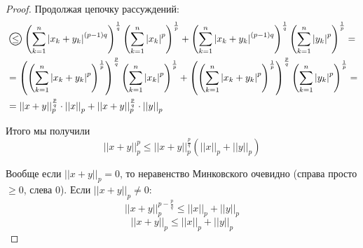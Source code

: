 \documentclass[../main.tex]{subfiles}
\begin{document}
\begin{proof}
    Продолжая цепочку рассуждений:
    \begin{equation*}
        \begin{aligned}
            &\oleq \left( \sum\limits_{ k=1}^{ n} \left| x_k+y_k\right|^{(p-1)q}\right)^ \frac{ 1}{ q} \left( \sum\limits_{ k=1}^{ n} \left| x_k\right|^p\right)^ \frac{ 1}{ p} + \left( \sum\limits_{ k=1}^{ n} \left| x_k+y_k\right|^{(p-1)q}\right)^ \frac{ 1}{ q} \left( \sum\limits_{ k=1}^{ n} \left| y_k\right|^p\right)^ \frac{ 1}{ p} = \\
            &=\left(\left( \sum\limits_{ k=1}^{ n} \left| x_k+y_k\right|^p\right)^ \frac{ 1}{ p}\right)^ \frac{ p}{ q} \left( \sum\limits_{ k=1}^{ n} \left| x_k\right|^p\right)^ \frac{ 1}{ p} + \left(\left( \sum\limits_{ k=1}^{ n} \left| x_k+y_k\right|^p\right)^ \frac{ 1}{ p}\right)^ \frac{ p}{ q} \left( \sum\limits_{ k=1}^{ n} \left| y_k\right|^p\right)^ \frac{ 1}{ p} =\\
            &=\left| \left| x+y\right|\right|_p^ \frac{ p}{ q} \cdot \left| \left| x\right|\right|_p+ \left| \left| x+y\right|\right|_p^ \frac{ p}{ q} \cdot \left| \left| y\right|\right|_p
        \end{aligned}
    \end{equation*}

    Итого мы получили
    \[ \left| \left| x+y\right|\right|_p^p \leq \left| \left| x+y\right|\right|_p^ \frac{ p}{ q} \left( \left| \left| x\right|\right|_p+\left| \left| y\right|\right|_p\right)\]

    Вообще если \( \left| \left| x+y\right|\right|_p=0\), то неравенство Минковского очевидно (справа просто \( \geq 0\), слева 0). Если \( \left| \left| x+y\right|\right|_p \neq 0\):
    \[ \left| \left| x+y\right|\right|_p^{p- \frac{ p}{ q} } \leq \left| \left| x\right|\right|_p + \left| \left| y\right|\right|_p\]
    \[ \left| \left| x+y\right|\right|_p \leq \left| \left| x\right|\right|_p + \left| \left| y\right|\right|_p\]
\end{proof}
\end{document}
